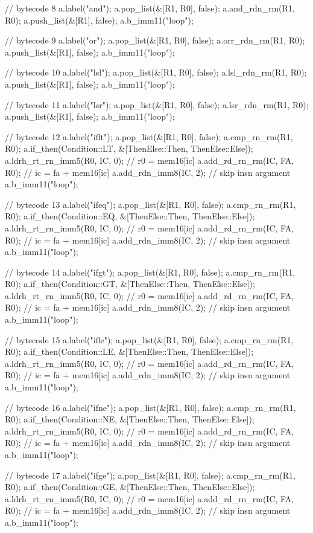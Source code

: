 {  // bytecode 8
  a.label("and");
  a.pop_list(&[R1, R0], false);
  a.and_rdn_rm(R1, R0);
  a.push_list(&[R1], false);
  a.b_imm11("loop");

  // bytecode 9
  a.label("or");
  a.pop_list(&[R1, R0], false);
  a.orr_rdn_rm(R1, R0);
  a.push_list(&[R1], false);
  a.b_imm11("loop");

  // bytecode 10
  a.label("lsl");
  a.pop_list(&[R1, R0], false);
  a.lsl_rdn_rm(R1, R0);
  a.push_list(&[R1], false);
  a.b_imm11("loop");

  // bytecode 11
  a.label("lsr");
  a.pop_list(&[R1, R0], false);
  a.lsr_rdn_rm(R1, R0);
  a.push_list(&[R1], false);
  a.b_imm11("loop");

  // bytecode 12
  a.label("iflt");
  a.pop_list(&[R1, R0], false);
  a.cmp_rn_rm(R1, R0);
  a.if_then(Condition::LT, &[ThenElse::Then, ThenElse::Else]);
  a.ldrh_rt_rn_imm5(R0, IC, 0); // r0 = mem16[ic]
  a.add_rd_rn_rm(IC, FA, R0); // ic = fa + mem16[ic]
  a.add_rdn_imm8(IC, 2); // skip insn argument
  a.b_imm11("loop");

  // bytecode 13
  a.label("ifeq");
  a.pop_list(&[R1, R0], false);
  a.cmp_rn_rm(R1, R0);
  a.if_then(Condition::EQ, &[ThenElse::Then, ThenElse::Else]);
  a.ldrh_rt_rn_imm5(R0, IC, 0); // r0 = mem16[ic]
  a.add_rd_rn_rm(IC, FA, R0); // ic = fa + mem16[ic]
  a.add_rdn_imm8(IC, 2); // skip insn argument
  a.b_imm11("loop");

  // bytecode 14
  a.label("ifgt");
  a.pop_list(&[R1, R0], false);
  a.cmp_rn_rm(R1, R0);
  a.if_then(Condition::GT, &[ThenElse::Then, ThenElse::Else]);
  a.ldrh_rt_rn_imm5(R0, IC, 0); // r0 = mem16[ic]
  a.add_rd_rn_rm(IC, FA, R0); // ic = fa + mem16[ic]
  a.add_rdn_imm8(IC, 2); // skip insn argument
  a.b_imm11("loop");

  // bytecode 15
  a.label("ifle");
  a.pop_list(&[R1, R0], false);
  a.cmp_rn_rm(R1, R0);
  a.if_then(Condition::LE, &[ThenElse::Then, ThenElse::Else]);
  a.ldrh_rt_rn_imm5(R0, IC, 0); // r0 = mem16[ic]
  a.add_rd_rn_rm(IC, FA, R0); // ic = fa + mem16[ic]
  a.add_rdn_imm8(IC, 2); // skip insn argument
  a.b_imm11("loop");

  // bytecode 16
  a.label("ifne");
  a.pop_list(&[R1, R0], false);
  a.cmp_rn_rm(R1, R0);
  a.if_then(Condition::NE, &[ThenElse::Then, ThenElse::Else]);
  a.ldrh_rt_rn_imm5(R0, IC, 0); // r0 = mem16[ic]
  a.add_rd_rn_rm(IC, FA, R0); // ic = fa + mem16[ic]
  a.add_rdn_imm8(IC, 2); // skip insn argument
  a.b_imm11("loop");

  // bytecode 17
  a.label("ifge");
  a.pop_list(&[R1, R0], false);
  a.cmp_rn_rm(R1, R0);
  a.if_then(Condition::GE, &[ThenElse::Then, ThenElse::Else]);
  a.ldrh_rt_rn_imm5(R0, IC, 0); // r0 = mem16[ic]
  a.add_rd_rn_rm(IC, FA, R0); // ic = fa + mem16[ic]
  a.add_rdn_imm8(IC, 2); // skip insn argument
  a.b_imm11("loop");

}
